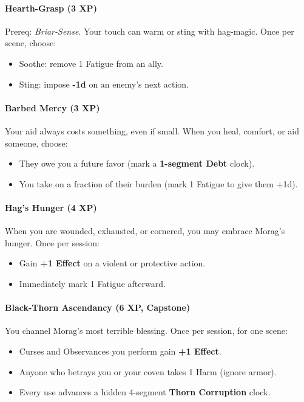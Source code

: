 \documentclass[11pt]{book}
\begin{document}
\paragraph{Hearth-Grasp (3 XP)}
Prereq: \emph{Briar-Sense}.  
Your touch can warm or sting with hag-magic.  
Once per scene, choose:
\begin{itemize}[leftmargin=*]
    \item Soothe: remove 1 Fatigue from an ally.
    \item Sting: impose \textbf{-1d} on an enemy's next action.
\end{itemize}

\paragraph{Barbed Mercy (3 XP)}
Your aid always costs something, even if small.  
When you heal, comfort, or aid someone, choose:
\begin{itemize}[leftmargin=*]
    \item They owe you a future favor (mark a \textbf{1-segment Debt} clock).
    \item You take on a fraction of their burden (mark 1 Fatigue to give them +1d).
\end{itemize}

\paragraph{Hag's Hunger (4 XP)}
When you are wounded, exhausted, or cornered, you may embrace Morag's hunger.  
Once per session:
\begin{itemize}[leftmargin=*]
    \item Gain \textbf{+1 Effect} on a violent or protective action.
    \item Immediately mark 1 Fatigue afterward.
\end{itemize}

\paragraph{Black-Thorn Ascendancy (6 XP, Capstone)}
You channel Morag's most terrible blessing.  
Once per session, for one scene:
\begin{itemize}[leftmargin=*]
    \item Curses and Observances you perform gain \textbf{+1 Effect}.
    \item Anyone who betrays you or your coven takes 1 Harm (ignore armor).
    \item Every use advances a hidden 4-segment \textbf{Thorn Corruption} clock.
\end{itemize}
\end{document}
